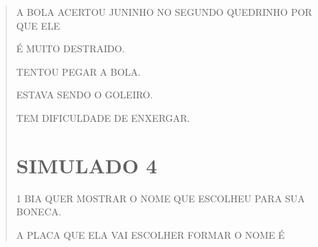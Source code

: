 \begin{escola}
{\begin{verse}
A BOLA ACERTOU JUNINHO NO SEGUNDO QUEDRINHO POR QUE ELE

\begin{escolha}
\item É MUITO DESTRAIDO.

\item TENTOU PEGAR A BOLA.

\item ESTAVA SENDO O GOLEIRO.

\item TEM DIFICULDADE DE ENXERGAR.
\end{escolha}


\chapter{SIMULADO 4}

\num{1} BIA QUER MOSTRAR O NOME QUE ESCOLHEU PARA SUA BONECA.

A PLACA QUE ELA VAI ESCOLHER FORMAR O NOME É

\begin{escolha}
\item %

\item %

\item %

\item %
\end{escolha}




\end{verse}}
\end{escola}
